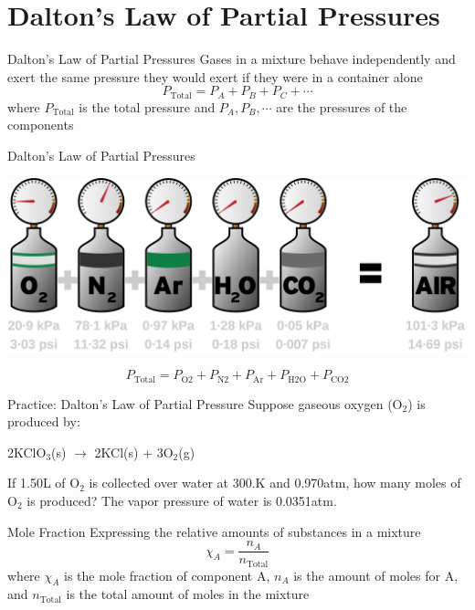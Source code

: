 \documentclass[11pt]{beamer}
\begin{document}
\section{Dalton's Law of Partial Pressures}

\begin{frame}{Dalton's Law of Partial Pressures}
  Gases in a mixture behave independently and exert the same pressure they would
  exert if they were in a container alone
  \begin{equation}
    P_\text{Total} = P_A + P_B + P_C + \cdots
  \end{equation}
  where $P_\text{Total}$ is the total pressure and $P_A, P_B, \cdots$ are the
  pressures of the components
\end{frame}

\begin{frame}{Dalton's Law of Partial Pressures}
  \begin{center}
    \includegraphics[width=\linewidth]{dalton_partial}
  \end{center}
  \begin{equation}
    P_\text{Total} = P_\text{O2} + P_\text{N2} + P_\text{Ar}
    + P_\text{H2O} + P_\text{CO2}
    \nonumber
  \end{equation}
\end{frame}

\begin{frame}{Practice: Dalton's Law of Partial Pressure}
  Suppose gaseous oxygen (O$_2$) is produced by:

  2KClO$_3$(s) $\rightarrow$ 2KCl(s) + 3O$_2$(g)

  If 1.50L of O$_2$ is collected over water at 300.K and 0.970atm,
  how many moles of O$_2$ is produced? The vapor pressure of water
  is 0.0351atm.
  \vspace{1.3in}
\end{frame}

\begin{frame}{Mole Fraction}
  Expressing the relative amounts of substances in a mixture
  \begin{equation}
    \chi_A = \frac{n_A}{n_\text{Total}}
  \end{equation}
  where $\chi_A$ is the mole fraction of component A, $n_A$ is the
  amount of moles for A, and $n_\text{Total}$ is the total amount of
  moles in the mixture
\end{frame}
\end{document}
